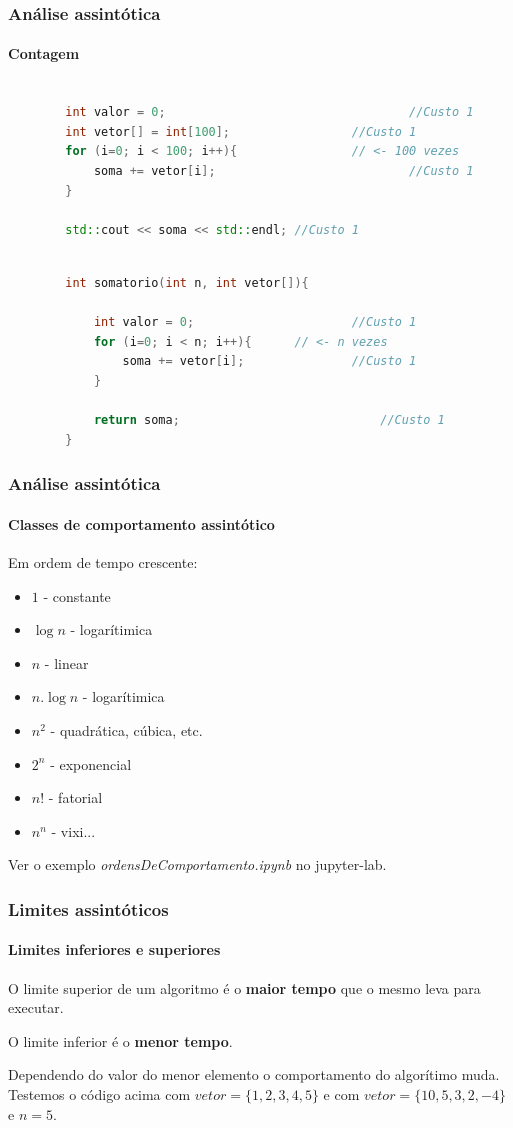 \begin{frame}[fragile]
	\frametitle{Análise assintótica}
	\framesubtitle{Contagem}
	
	\begin{lstlisting}[language=C++, caption={Um algorítimo de tempo constante}, label={lst:umAlgo}]
		
		int valor = 0; 									//Custo 1
		int vetor[] = int[100];					//Custo 1
		for (i=0; i < 100; i++){				// <- 100 vezes
			soma += vetor[i];							//Custo 1
		}
		
		std::cout << soma << std::endl;	//Custo 1
	\end{lstlisting}
	
	
	\begin{lstlisting}[language=C++, caption={Um algorítimo de tempo variável}, label={lst:umAlgo}]
		
		int somatorio(int n, int vetor[]){
			
			int valor = 0; 						//Custo 1
			for (i=0; i < n; i++){		// <- n vezes
				soma += vetor[i];				//Custo 1
			}
			
			return soma;							//Custo 1
		}
	\end{lstlisting}
	
	
\end{frame}

\begin{frame}
	\frametitle{Análise assintótica}
	\framesubtitle{Classes de comportamento assintótico}
	\par Em ordem de tempo crescente:
	\begin{itemize}
		\item $1$ - constante
		\item $\log n$ - logarítimica
		\item $n$ - linear
		\item $n.\log n$ - logarítimica
		\item $n^2$ - quadrática, cúbica, etc. 
		\item $2^n$ - exponencial
		\item $n!$ - fatorial
		\item $n^n$ - vixi...
	\end{itemize}
	\par Ver o exemplo \textit{ordensDeComportamento.ipynb} no jupyter-lab.
\end{frame}

\begin{frame}[fragile]
	\frametitle{Limites assintóticos}
	\framesubtitle{Limites inferiores e superiores}
	\par O limite superior de um algoritmo é o \textbf{maior tempo} que o mesmo leva para executar.
	\par O limite inferior é o \textbf{menor tempo}. 
	
	\par Dependendo do valor do menor elemento o comportamento do algorítimo muda. Testemos o código acima com $vetor = \{1,2,3,4,5\}$ e com $vetor = \{10,5,3,2,-4\}$ e $n = 5$.
\end{frame}


